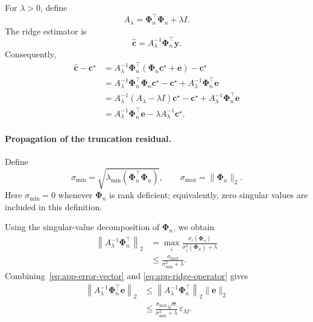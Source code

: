 For $\lambda>0$, define
\[
A_\lambda
=
\mathbf{\Phi}_n^\top\mathbf{\Phi}_n+\lambda I.
\]
The ridge estimator is
\[
\widehat{\mathbf{c}}
=
A_\lambda^{-1}\mathbf{\Phi}_n^\top\mathbf{y}.
\]
Consequently,
\begin{align}
\widehat{\mathbf{c}}-\mathbf{c}^\star
&=
A_\lambda^{-1}\mathbf{\Phi}_n^\top
\left(
\mathbf{\Phi}_n\mathbf{c}^\star+\mathbf{e}
\right)
-\mathbf{c}^\star
\nonumber\\
&=
A_\lambda^{-1}
\mathbf{\Phi}_n^\top\mathbf{\Phi}_n\mathbf{c}^\star
-\mathbf{c}^\star
+
A_\lambda^{-1}\mathbf{\Phi}_n^\top\mathbf{e}
\nonumber\\
&=
A_\lambda^{-1}
\left(
A_\lambda-\lambda I
\right)
\mathbf{c}^\star
-\mathbf{c}^\star
+
A_\lambda^{-1}\mathbf{\Phi}_n^\top\mathbf{e}
\nonumber\\
&=
A_\lambda^{-1}\mathbf{\Phi}_n^\top\mathbf{e}
-
\lambda A_\lambda^{-1}\mathbf{c}^\star.
\label{eq:app-split}
\end{align}

\paragraph{Propagation of the truncation residual.}
Define
\[
\sigma_{\min}
=
\sqrt{
\lambda_{\min}
\left(
\mathbf{\Phi}_n^\top\mathbf{\Phi}_n
\right)
},
\qquad
\sigma_{\max}
=
\|\mathbf{\Phi}_n\|_2.
\]
Here $\sigma_{\min}=0$ whenever $\mathbf{\Phi}_n$ is rank deficient;
equivalently, zero singular values are included in this definition.

Using the singular-value decomposition of $\mathbf{\Phi}_n$, we obtain
\begin{align}
\left\|
A_\lambda^{-1}\mathbf{\Phi}_n^\top
\right\|_2
&=
\max_i
\frac{
\sigma_i(\mathbf{\Phi}_n)
}{
\sigma_i^2(\mathbf{\Phi}_n)+\lambda
}
\nonumber\\
&\leq
\frac{
\sigma_{\max}
}{
\sigma_{\min}^2+\lambda
}.
\label{eq:app-ridge-operator}
\end{align}
Combining~\eqref{eq:app-error-vector} and
\eqref{eq:app-ridge-operator} gives
\begin{align}
\left\|
A_\lambda^{-1}\mathbf{\Phi}_n^\top\mathbf{e}
\right\|_2
&\leq
\left\|
A_\lambda^{-1}\mathbf{\Phi}_n^\top
\right\|_2
\|\mathbf{e}\|_2
\nonumber\\
&\leq
\frac{
\sigma_{\max}\sqrt{n}
}{
\sigma_{\min}^2+\lambda
}
\,\varepsilon_M.
\label{eq:app-truncation-term}
\end{align}

